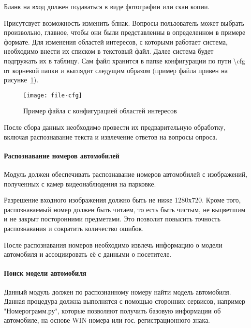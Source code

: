 Бланк на вход должен подаваться в виде фотографии или скан копии.

Присутсвует возможность изменить блнак. Вопросы пользователь может выбрать произвольно, главное, чтобы они были представленны в определенном в примере формате. Для изменения областей интересов, с которыми работает система, необходимо внести их списком в текстовый файл. Далее система будет подгружать их в таблицу. Сам файл хранится в папке конфигурации по пути \textbackslash cfg от корневой папки и выглядит следущим образом (пример файла привен на рисунке~\ref{f:file-cfg}).

\begin{figure}[ht]
	\centering
	\vspace{\toppaddingoffigure}
	\texttt{[image: file-cfg]}
	\caption{Пример файла с конфигурацией областей интересов}
	\label{f:file-cfg}
\end{figure}

После сбора данных необходимо провести их предварительную обработку, включая распознавание текста и извлечение ответов на вопросы опроса.


\paragraph{­Распознавание номеров автомобилей}

Модуль должен обеспечивать распознавание номеров автомобилей с изображений, полученных с камер видеонаблюдения на парковке.

Разрешение входного изображения должно быть не ниже 1280х720. Кроме того, распознаваемый номер должен быть читаем, то есть быть чистым, не выцветшим и не закрыт посторонними предметами. Это позволит повысить точность распознавания и сократить количество ошибок.

После распознавания номеров необходимо извлечь информацию о модели автомобиля и ассоциировать её с данными о посетителе.

\paragraph{Поиск модели автомобиля}

Данный модуль должен по распознанному номеру найти модель автомобиля. Данная процедура должна выполнятся с помощью сторонних сервисов, например "Номерограмм.ру", которые позволяют получить базовую информации об автомобиле, на основе WIN-номера или гос. регистрационного знака.



